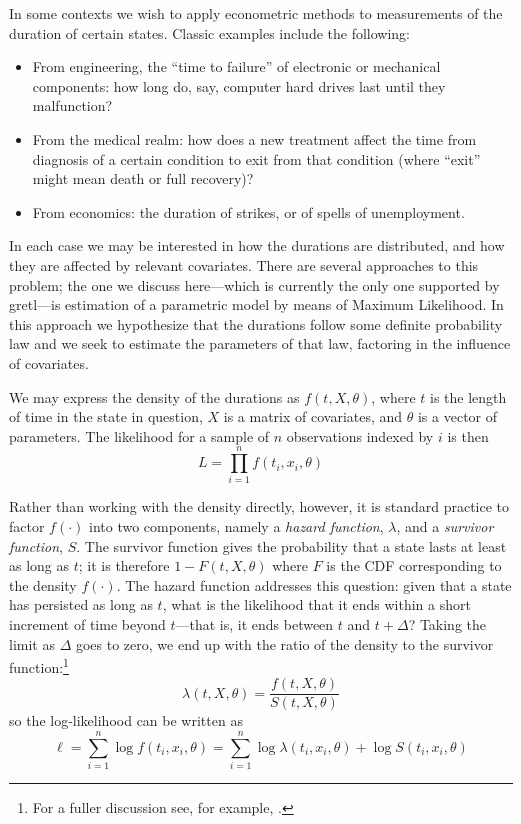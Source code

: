 In some contexts we wish to apply econometric methods to measurements
of the duration of certain states. Classic examples include the
following:
\begin{itemize}
\item From engineering, the ``time to failure'' of electronic or
  mechanical components: how long do, say, computer hard drives
  last until they malfunction?
\item From the medical realm: how does a new treatment affect the
  time from diagnosis of a certain condition to exit from that
  condition (where ``exit'' might mean death or full recovery)?
\item From economics: the duration of strikes, or of spells of
  unemployment.
\end{itemize}

In each case we may be interested in how the durations are
distributed, and how they are affected by relevant covariates.  There
are several approaches to this problem; the one we discuss
here---which is currently the only one supported by gretl---is
estimation of a parametric model by means of Maximum Likelihood.  In
this approach we hypothesize that the durations follow some definite
probability law and we seek to estimate the parameters of that law,
factoring in the influence of covariates.

We may express the density of the durations as $f(t, X, \theta)$,
where $t$ is the length of time in the state in question, $X$ is a
matrix of covariates, and $\theta$ is a vector of parameters.  The
likelihood for a sample of $n$ observations indexed by $i$ is then
\[
L = \prod_{i=1}^n f(t_i, x_i, \theta)
\]

Rather than working with the density directly, however, it is standard
practice to factor $f(\cdot)$ into two components, namely a
\emph{hazard function}, $\lambda$, and a \emph{survivor function},
$S$.  The survivor function gives the probability that a state lasts
at least as long as $t$; it is therefore $1 - F(t, X, \theta)$ where
$F$ is the CDF corresponding to the density $f(\cdot)$. The hazard
function addresses this question: given that a state has persisted as
long as $t$, what is the likelihood that it ends within a short
increment of time beyond $t$---that is, it ends between $t$ and $t +
\Delta$?  Taking the limit as $\Delta$ goes to zero, we end up with
the ratio of the density to the survivor function:\footnote{For a
  fuller discussion see, for example, \cite{davidson-mackinnon04}.}
\begin{equation}
\label{eq:surv-decomp}
\lambda(t, X, \theta) = \frac{f(t, X, \theta)}{S(t, X, \theta)}
\end{equation}
so the log-likelihood can be written as
\begin{equation}
\label{eq:surv-loglik}
\ell = \sum_{i=1}^n \log f(t_i, x_i, \theta) = 
\sum_{i=1}^n \log \lambda(t_i, x_i, \theta) + 
\log S(t_i, x_i, \theta)
\end{equation}

